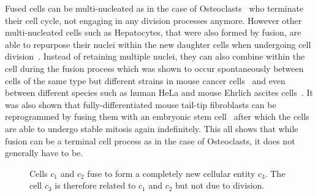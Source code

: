 Fused cells can be multi-nucleated as in the case of Osteoclasts~\cite{Kölliker1873} who
terminate their cell cycle, not engaging in any division processes anymore.
However other multi-nucleated cells such as Hepatocytes, that were also formed by fusion,
are able to repurpose their nuclei within the new daughter cells when undergoing cell
division~\cite{Duncan2010}.
Instead of retaining multiple nuclei, they can also combine within the cell during the fusion
process which was shown to occur spontaneously between cells of the same type but different strains
in mouse cancer cells~\cite{Barski1960,Barski1961} and even between different species such as human
HeLa and mouse Ehrlich ascites cells~\cite{Harris1965}.
It was also shown that fully-differentiated mouse tail-tip fibroblasts can be reprogrammed by fusing
them with an embryonic stem cell~\cite{Takahashi2006} after which the cells are able to undergo
stable mitosis again indefinitely.
This all shows that while fusion can be a terminal cell process as in the case of Osteoclasts, it
does not generally have to be.

\begin{figure}[ht]
    \centering
    \caption[Cellular Fusion]{
        Cells $c_1$ and $c_2$ fuse to form a completely new cellular entity $c_3$.
        The cell $c_3$ is therefore related to $c_1$ and $c_2$ but not due to division.
    }
    \label{fig:theory-cell-fusion}
\end{figure}

